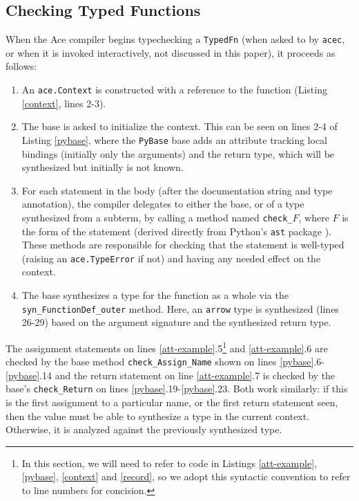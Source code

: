 \documentclass[10pt,preprint]{sigplanconf}
\begin{document}
{\subsection{Checking Typed Functions}
When the Ace compiler begins typechecking a \verb|TypedFn| (when asked to by \verb|acec|, or when it is  invoked interactively, not discussed in this paper), it proceeds as follows:
\begin{enumerate}
\item An \verb|ace.Context| is constructed with a reference to the function (Listing \ref{context}, lines 2-3).
\item The base is asked to initialize the context. This can be seen on lines 2-4 of Listing \ref{pybase}, where the \verb|PyBase| base adds an attribute tracking local bindings (initially only the arguments) and the return type, which will be synthesized but initially is not known. 
\item For each statement in the body (after the documentation string and type annotation), the compiler delegates to either the base, or of a type synthesized from a subterm, by calling a method named \verb|check_|$F$, where $F$ is the form of the statement (derived directly from Python's \verb|ast| package \cite{python}). These methods are responsible for checking that the statement is well-typed (raising an \verb|ace.TypeError| if not) and having any needed effect on the context. 
\item The base synthesizes a type for the function as a whole via the \verb|syn_FunctionDef_outer| method. Here, an \verb|arrow| type is synthesized (lines 26-29) based on the argument signature and the synthesized return type.
\end{enumerate}
The assignment statements on lines \ref{att-example}.5\footnote{In this section, we will need to refer to code in Listings \ref{att-example}, \ref{pybase}, \ref{context} and \ref{record}, so we adopt this syntactic convention to refer to line numbers for concision.} and \ref{att-example}.6 are checked by the base method \verb|check_Assign_Name| shown on lines \ref{pybase}.6-\ref{pybase}.14 and the return statement on line \ref{att-example}.7 is checked by the base's \verb|check_Return| on lines \ref{pybase}.19-\ref{pybase}.23. Both work similarly: if this is the first assignment to a particular name, or the first return statement seen, then the value must be able to synthesize a type in the current context. Otherwise, it is analyzed against the previously synthesized type.

}
\end{document}
